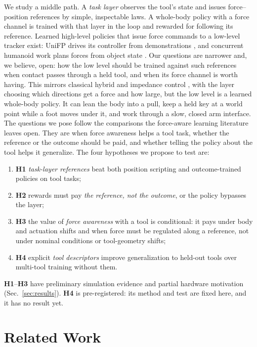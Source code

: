 \documentclass[conference]{IEEEtran}
\newcommand{\hyp}[1]{\textbf{H#1}}
\begin{document}
We study a middle path. A \emph{task layer} observes the tool's state and issues force--position references by simple,
inspectable laws. A whole-body policy with a force channel is trained with that layer in the loop and rewarded for
following its reference. Learned high-level policies that issue force commands to a low-level tracker exist: UniFP
drives its controller from demonstrations \citep{zhi2025unified}, and concurrent humanoid work plans forces from object
state \citep{zhao2026ctrlf}. Our questions are narrower and, we believe, open: how the low level should be trained
against such references when contact passes through a held tool, and when its force channel is worth having. This mirrors classical hybrid and impedance control \citep{raibert1981hybrid,
hogan1985impedance}, with the layer choosing which directions get a force and how large, but the low level is a learned
whole-body policy. It can lean the body into a pull, keep a held key at a world point while a foot moves under it, and
work through a slow, closed arm interface. The questions we pose follow the comparisons the force-aware learning
literature leaves open. They are when force awareness helps a tool task, whether the reference or the outcome should be
paid, and whether telling the policy about the tool helps it generalize. The four hypotheses we propose to test are:
\begin{enumerate}
\item \hyp{1} \emph{task-layer references} beat both position scripting and outcome-trained policies on tool tasks;
\item \hyp{2} rewards must pay \emph{the reference, not the outcome}, or the policy bypasses the layer;
\item \hyp{3} the value of \emph{force awareness} with a tool is conditional: it pays under body and actuation shifts and
when force must be regulated along a reference, not under nominal conditions or tool-geometry shifts;
\item \hyp{4} explicit \emph{tool descriptors} improve generalization to held-out tools over multi-tool training without
them.
\end{enumerate}
\hyp{1}--\hyp{3} have preliminary simulation evidence and partial hardware motivation (Sec.~\ref{sec:results}).
\hyp{4} is pre-registered: its method and test are fixed here, and it has no result yet.

\section{Related Work}
\end{document}
